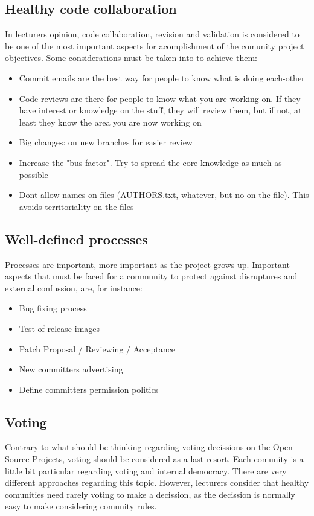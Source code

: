 \documentclass[11pt]{article}
\begin{document}
\subsection{Healthy code collaboration}
In lecturers opinion, code collaboration, revision and validation is considered to be one of the most important aspects for acomplishment of the comunity project objectives. Some considerations must be taken into to achieve them:
\begin{itemize}\itemsep0pt
\item{Commit emails are the best way for people to know what is doing each-other}
\item{Code reviews are there for people to know what you are working on. If they have interest or knowledge on the stuff, they will review them, but if not, at least they know the area you are now working on}
\item{Big changes: on new branches for easier review}
\item{Increase the "bus factor". Try to spread the core knowledge as much as possible}
\item{Dont allow names on files (AUTHORS.txt, whatever, but no on the file). This avoids territoriality on the files}
\end{itemize}

\subsection{Well-defined processes}
Processes are important, more important as the project grows up. Important aspects that must be faced for a community to protect against disruptures and external confussion, are, for instance:
\begin{itemize}\itemsep0pt
\item{Bug fixing process}
\item{Test of release images}
\item{Patch Proposal / Reviewing / Acceptance}
\item{New committers advertising}
\item{Define committers permission politics}
\end{itemize}

\subsection{Voting}
Contrary to what should be thinking regarding voting decissions on the Open Source Projects, voting should be considered as a last resort.
Each comunity is a little bit particular regarding voting and internal democracy. There are very different approaches regarding this topic. However, lecturers consider that healthy comunities need rarely voting to make a decission, as the decission is normally easy to make considering comunity rules.
\end{document}
